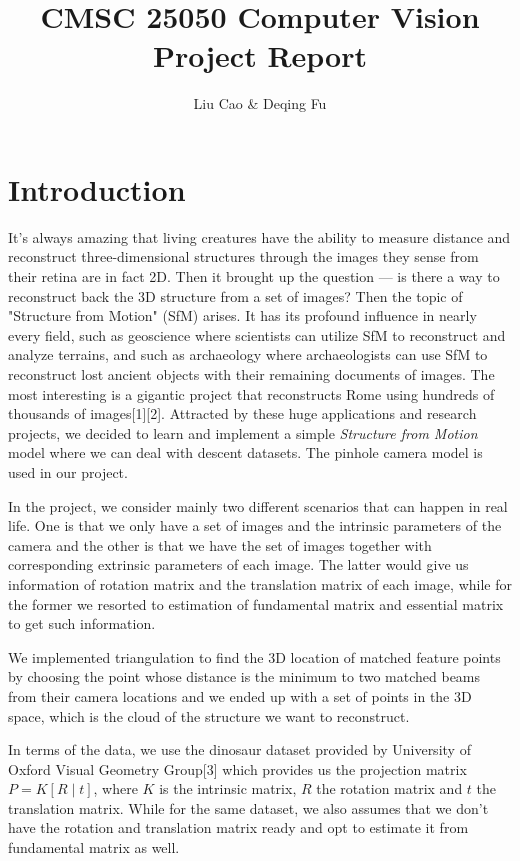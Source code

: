 \documentclass[10pt]{article}
\title{CMSC 25050 Computer Vision Project Report}
\author{Liu Cao \& Deqing Fu}
\date{}
\begin{document}
\maketitle
\section*{Introduction}

 It's always amazing that living creatures have the ability to measure distance and reconstruct three-dimensional structures through the images they sense from their retina are in fact 2D. Then it brought up the question --- is there a way to reconstruct back the 3D structure from a set of images? Then the topic of "Structure from Motion" (SfM) arises. It has its profound influence in nearly every field, such as geoscience where scientists can utilize SfM to reconstruct and analyze terrains, and such as archaeology where archaeologists can use SfM to reconstruct lost ancient objects with their remaining documents of images. The most interesting is a gigantic project that reconstructs Rome using hundreds of thousands of images[1][2]. Attracted by these huge applications and research projects, we decided to learn and implement a simple \emph{Structure from Motion} model where we can deal with descent datasets. The pinhole camera model is used in our project.

In the project, we consider mainly two different scenarios that can happen in real life. One is that we only have a set of images and the intrinsic parameters of the camera and the other is that we have the set of images together with corresponding extrinsic parameters of each image. The latter would give us information of rotation matrix and the translation matrix of each image, while for the former we resorted to estimation of fundamental matrix and essential matrix to get such information.

We implemented triangulation to find the 3D location of matched feature points by choosing the point whose distance is the minimum to two matched beams from their camera locations and we ended up with a set of points in the 3D space, which is the cloud of the structure we want to reconstruct.

In terms of the data, we use the dinosaur dataset provided by University of Oxford Visual Geometry Group[3] which provides us the projection matrix $P = K [R\mid t]$, where $K$ is the intrinsic matrix, $R$ the rotation matrix and $t$ the translation matrix. While for the same dataset, we also assumes that we don't have the rotation and translation matrix ready and opt to estimate it from fundamental matrix as well.
\end{document}
